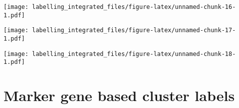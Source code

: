 \documentclass[]{article}
\newenvironment{Shaded}{\begin{snugshade}}{\end{snugshade}}
\newcommand{\DataTypeTok}[1]{\textcolor[rgb]{0.13,0.29,0.53}{#1}}
\newcommand{\KeywordTok}[1]{\textcolor[rgb]{0.13,0.29,0.53}{\textbf{#1}}}
\newcommand{\NormalTok}[1]{#1}
\newcommand{\OperatorTok}[1]{\textcolor[rgb]{0.81,0.36,0.00}{\textbf{#1}}}
\newcommand{\StringTok}[1]{\textcolor[rgb]{0.31,0.60,0.02}{#1}}
\begin{document}
\texttt{[image: labelling\_integrated\_files/figure-latex/unnamed-chunk-16-1.pdf]}

\begin{Shaded}
\end{Shaded}

\texttt{[image: labelling\_integrated\_files/figure-latex/unnamed-chunk-17-1.pdf]}

\begin{Shaded}
\end{Shaded}

\texttt{[image: labelling\_integrated\_files/figure-latex/unnamed-chunk-18-1.pdf]}

\hypertarget{marker-gene-based-cluster-labels}{%
\section{Marker gene based cluster
labels}\label{marker-gene-based-cluster-labels}}
\end{document}
